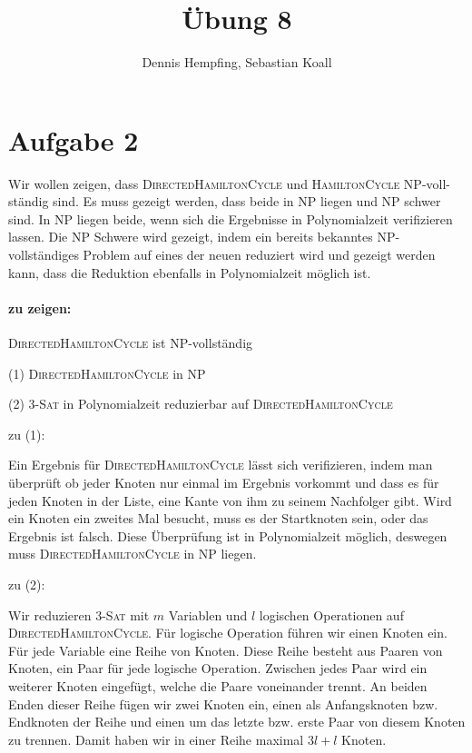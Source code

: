 \documentclass[12pt]{scrartcl}%
\theoremstyle{nonumberplain}
\begin{document}
\author{Dennis Hempfing, Sebastian Koall}
\title{Übung 8}
\date{} 
\pagestyle{myheadings}

\maketitle %

\section*{Aufgabe 2}
Wir wollen zeigen, dass {\scshape DirectedHamiltonCycle} und {\scshape HamiltonCycle} NP-voll-ständig sind.
Es muss gezeigt werden, dass beide in NP liegen und NP schwer sind. In NP liegen beide, wenn sich die Ergebnisse in Polynomialzeit verifizieren lassen. Die NP Schwere wird gezeigt, indem ein bereits bekanntes NP-vollständiges Problem auf eines der neuen reduziert wird und gezeigt werden kann, dass die Reduktion ebenfalls in Polynomialzeit möglich ist.

\paragraph{zu zeigen:} {\scshape DirectedHamiltonCycle} ist NP-vollständig
\vspace{0.2cm}

(1) {\scshape DirectedHamiltonCycle} in NP
\vspace{0.2cm}

(2) {\scshape 3-Sat} in Polynomialzeit reduzierbar auf {\scshape DirectedHamiltonCycle}
\vspace{0.4cm}

zu (1): 

Ein Ergebnis für {\scshape DirectedHamiltonCycle} lässt sich verifizieren, indem man überprüft ob jeder Knoten nur einmal im Ergebnis vorkommt und dass es für jeden Knoten in der Liste, eine Kante von ihm zu seinem Nachfolger gibt. Wird ein Knoten ein zweites Mal besucht, muss es der Startknoten sein, oder das Ergebnis ist falsch. Diese Überprüfung ist in Polynomialzeit möglich, deswegen muss {\scshape DirectedHamiltonCycle} in NP liegen.
\vspace{0.2cm}

zu (2):  

Wir reduzieren {\scshape 3-Sat} mit $m$ Variablen und $l$ logischen Operationen auf {\scshape DirectedHamiltonCycle}. Für logische Operation führen wir einen Knoten ein. Für jede Variable eine Reihe von Knoten. Diese Reihe besteht aus Paaren von Knoten, ein Paar für jede logische Operation. Zwischen jedes Paar wird ein weiterer Knoten eingefügt, welche die Paare voneinander trennt. An beiden Enden dieser Reihe fügen wir zwei Knoten ein, einen als Anfangsknoten bzw. Endknoten der Reihe und einen um das letzte bzw. erste Paar von diesem Knoten zu trennen. Damit haben wir in einer Reihe maximal $3l + l$ Knoten.
\end{document}
